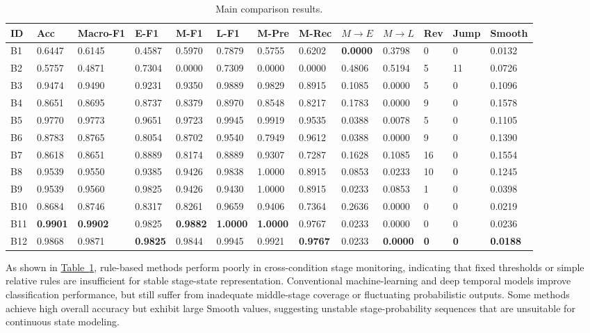 \documentclass[a4paper,fleqn]{cas-sc}
\providecommand{\tabref}{}
\renewcommand{\tabref}[1]{\hyperref[#1]{Table~\ref*{#1}}}
\begin{document}
  \begin{table}[!htbp]
    \centering
    \scriptsize
  \caption{Main comparison results.}
    \label{tab:8}
    \begin{adjustbox}{max width=\textwidth}
      \begin{tabular}{lllllllllllll}
        \toprule
        \textbf{ID} & \textbf{Acc} & \textbf{Macro-F1} & \textbf{E-F1} & \textbf{M-F1} & \textbf{L-F1} & \textbf{M-Pre} & \textbf{M-Rec} & \textbf{$M\rightarrow E$} & \textbf{$M\rightarrow L$} & \textbf{Rev} & \textbf{Jump} & \textbf{Smooth} \\
        \midrule
        B1 & 0.6447 & 0.6145 & 0.4587 & 0.5970 & 0.7879 & 0.5755 & 0.6202 & \textbf{0.0000} & 0.3798 & 0 & 0 &0.0132 \\
        B2 & 0.5757 & 0.4871 & 0.7304 & 0.0000 & 0.7309 & 0.0000 & 0.0000 & 0.4806 & 0.5194 & 5 & 11 & 0.0726 \\
        B3 & 0.9474 & 0.9490 & 0.9231 & 0.9350 & 0.9889 & 0.9829 & 0.8915 & 0.1085 & 0.0000 & 5 & 0 & 0.1096 \\
        B4 & 0.8651 & 0.8695 & 0.8737 & 0.8379 & 0.8970 & 0.8548 & 0.8217 & 0.1783 & 0.0000 & 9 & 0 & 0.1578 \\
        B5 & 0.9770 & 0.9773 & 0.9651 & 0.9723 & 0.9945 & 0.9919 & 0.9535 & 0.0388 & 0.0078 & 5 & 0 & 0.1105 \\
        B6 & 0.8783 & 0.8765 & 0.8054 & 0.8702 & 0.9540 & 0.7949 & 0.9612 & 0.0388 & 0.0000 & 9 & 0 & 0.1390 \\
        B7 & 0.8618 & 0.8651 & 0.8889 & 0.8174 & 0.8889 & 0.9307 & 0.7287 & 0.1628 & 0.1085 & 16 & 0 & 0.1554 \\
        B8 & 0.9539 & 0.9550 & 0.9385 & 0.9426 & 0.9838 & 1.0000 & 0.8915 & 0.0853 & 0.0233 & 10 & 0 & 0.1245 \\
        B9 & 0.9539 & 0.9560 & 0.9825 & 0.9426 & 0.9430 & 1.0000 & 0.8915 & 0.0233 & 0.0853 & 1 & 0 & 0.0398 \\
        B10 & 0.8684 & 0.8746 & 0.8317 & 0.8261 & 0.9659 & 0.9406 & 0.7364 & 0.2636 & 0.0000 & 0 & 0 & 0.0219 \\
        B11 & \textbf{0.9901} & \textbf{0.9902} & 0.9825 & \textbf{0.9882} & \textbf{1.0000} & \textbf{1.0000} & 0.9767 & 0.0233 & 0.0000 & 0 & 0 & 0.0236 \\
        B12 & 0.9868 & 0.9871 & \textbf{0.9825} & 0.9844 & 0.9945 & 0.9921 & \textbf{0.9767} & 0.0233 & \textbf{0.0000} & \textbf{0} & \textbf{0} &  \textbf{0.0188} \\
        \bottomrule
      \end{tabular}
    \end{adjustbox}
  \end{table}
  As shown in \tabref{tab:8}, rule-based methods perform poorly in cross-condition stage monitoring, indicating that fixed thresholds or simple relative rules are insufficient for stable stage-state representation. Conventional machine-learning and deep temporal models improve classification performance, but still suffer from inadequate middle-stage coverage or fluctuating probabilistic outputs. Some methods achieve high overall accuracy but exhibit large Smooth values, suggesting unstable stage-probability sequences that are unsuitable for continuous state modeling.
  
\end{document}

